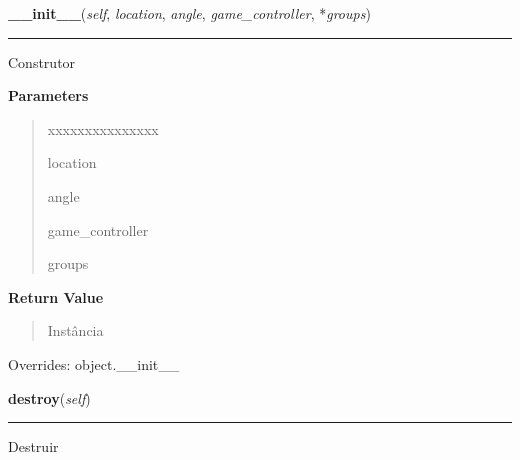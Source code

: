     \vspace{0.5ex}

\hspace{.8\funcindent}\begin{boxedminipage}{\funcwidth}

    \raggedright \textbf{\_\_init\_\_}(\textit{self}, \textit{location}, \textit{angle}, \textit{game\_controller}, *\textit{groups})

    \vspace{-1.5ex}

    \rule{\textwidth}{0.5\fboxrule}
\setlength{\parskip}{2ex}
    Construtor

\setlength{\parskip}{1ex}
      \textbf{Parameters}
      \vspace{-1ex}

      \begin{quote}
        \begin{Ventry}{xxxxxxxxxxxxxxx}

          \item[location]

          \item[angle]

          \item[game\_controller]

          \item[groups]

        \end{Ventry}

      \end{quote}

      \textbf{Return Value}
    \vspace{-1ex}

      \begin{quote}
      Instância

      \end{quote}

      Overrides: object.\_\_init\_\_

    \end{boxedminipage}

    \label{pygame-asteroids:bullet:Bullet:destroy}

    \vspace{0.5ex}

\hspace{.8\funcindent}\begin{boxedminipage}{\funcwidth}

    \raggedright \textbf{destroy}(\textit{self})

    \vspace{-1.5ex}

    \rule{\textwidth}{0.5\fboxrule}
\setlength{\parskip}{2ex}
    Destruir

\setlength{\parskip}{1ex}
    \end{boxedminipage}

